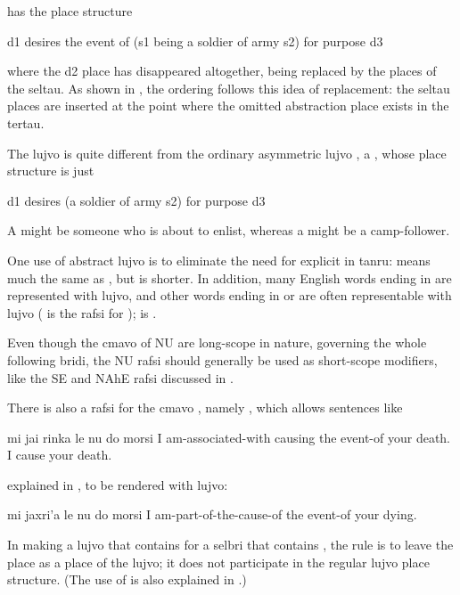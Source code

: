 {\noindent}has the place structure
\begin{example}
d1 desires the event of (s1 being a soldier of army s2)\n
\T	for purpose d3
\end{example}

{\noindent}where the d2 place has disappeared altogether, being replaced
    by the places of the seltau. As shown in , the ordering follows this idea
    of replacement: the seltau places are inserted at the point
    where the omitted abstraction place exists in the tertau. 

The lujvo  is quite different from the ordinary
    asymmetric lujvo , a , whose place
    structure is just
\begin{example}
d1 desires (a soldier of army s2) for purpose d3
\end{example}

A  might be someone who is about to enlist,
    whereas a  might be a camp-follower.

One use of abstract lujvo is to eliminate the need for
    explicit  in tanru:  means much the
    same as , but is shorter. In addition,
    many English words ending in  are represented with
     lujvo, and other words ending in  or 
    are often representable with  lujvo ( is the
    rafsi for );  is .

Even though the cmavo of NU are long-scope in nature,
    governing the whole following bridi, the NU rafsi should
    generally be used as short-scope modifiers, like the SE and
    NAhE rafsi discussed in .

There is also a rafsi for the cmavo , namely ,
    which allows sentences like
\begin{example}
mi jai rinka le nu do morsi\n
I am-associated-with causing the event-of your death.\n
I cause your death.
\end{example}

{\noindent}explained in , to be
    rendered with lujvo:
\begin{example}
mi jaxri'a le nu do morsi\n
I am-part-of-the-cause-of the event-of your dying.
\end{example}

In making a lujvo that contains  for a selbri that
    contains , the rule is to leave the  place as a
     place of the lujvo; it does not participate in the
    regular lujvo place structure. (The use of  is also
    explained in .)



